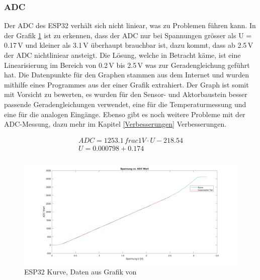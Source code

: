 \subsubsection{ADC} \label{ADC}
Der ADC des ESP32 verhält sich nicht liniear, was zu Problemen führen kann. In der Grafik \ref{pic: ESP32_Kurve} ist zu erkennen, dass der ADC nur bei Spannungen grösser als U = 0.17\,V und kleiner als 3.1\,V überhaupt brauchbar ist, dazu kommt, dass ab 2.5\,V der ADC nichtliniear ansteigt. Die Lösung, welche in Betracht käme, ist eine Linearisierung im Bereich von  0.2\,V bis 2.5\,V was zur Geradengleichung geführt hat. Die Datenpunkte für den Graphen stammen aus dem Internet und wurden mithilfe eines Programmes aus der einer Grafik extrahiert. Der Graph ist somit mit Vorsicht zu bewerten, es wurden für den Sensor- und Aktorbaustein besser passende Geradengleichungen verwendet, eine für die Temperaturmessung und eine für die analogen Eingänge. Ebenso gibt es noch weitere Probleme mit der ADC-Messung, dazu mehr im Kapitel \ref{Verbesserungen} Verbesserungen.

\begin{align}
ADC = 1253.1\,frac{1}{V}\cdot U - 218.54 \label{ADC_Kurve} \\
U = 0.000798 + 0.174 \label{U_kurve}\\
\end{align}

\begin{figure}[h!]
	\centering
	\includegraphics[width=\textwidth]{graphics/ESP32_Kurve.png}
	\caption{ESP32 Kurve, Daten aus Grafik von \cite{randomnerdtutorials_esp32_2019}}
	\label{pic: ESP32_Kurve}
\end{figure}

